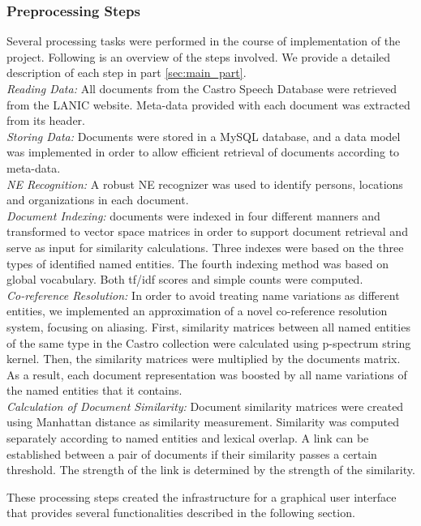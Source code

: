 \subsubsection{Preprocessing Steps}
Several processing tasks were performed in the course of implementation of the project. Following is an overview of the steps involved. We provide a  detailed description of each step in part  \ref{sec:main_part}.\\
\emph{Reading Data:} All documents from the Castro Speech Database were retrieved from the LANIC website. Meta-data provided with each document was extracted from its header. \\
\emph{Storing Data:} Documents were stored in a MySQL database, and a data model was implemented in order to allow efficient retrieval of documents according to meta-data. \\
\emph{NE Recognition:} A robust NE recognizer was used to identify persons, locations and organizations in each document.\\
\emph{Document Indexing:} documents were indexed in four different manners and transformed to vector space matrices in order to support document retrieval and serve as input for similarity calculations. Three indexes were based on the three types of identified named entities. The fourth indexing method was based on global vocabulary. Both tf/idf scores and simple counts were computed.\\
\emph{Co-reference Resolution:} In order to avoid treating name variations as different entities, 
we implemented an approximation of a novel co-reference resolution system, focusing on aliasing.
First, similarity matrices between all named entities of the same type in the Castro collection were calculated using p-spectrum string kernel.
Then, the similarity matrices were multiplied by the documents matrix. As a result, each document representation was boosted by all name 
variations of the named entities that it contains.\\
\emph{Calculation of Document Similarity:} Document similarity matrices were created using Manhattan distance as similarity measurement. 
Similarity was computed separately according to named entities and  lexical overlap. 
A link can be established between a pair of documents if their similarity passes a certain threshold. 
The strength of the link is determined by the strength of the similarity.

These processing steps created the infrastructure for a graphical user interface that provides several
functionalities described in the following section.

